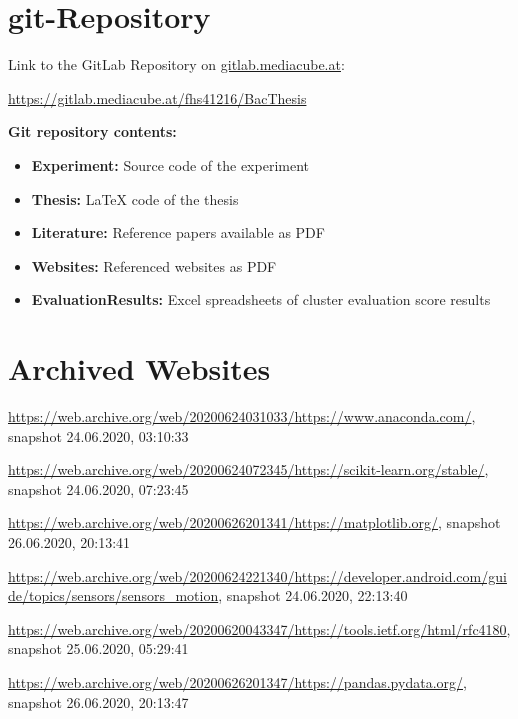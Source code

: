 \begin{appendices}

\section{git-Repository}



Link to the GitLab Repository on {\url{gitlab.mediacube.at}}:

{\color{red}\url{https://gitlab.mediacube.at/fhs41216/BacThesis}}

\vspace{5mm} %

\textbf{Git repository contents:}

\begin{itemize}
	\item \textbf{Experiment:} Source code of the experiment
	\item \textbf{Thesis:} LaTeX code of the thesis
	\item \textbf{Literature:} Reference papers available as PDF
	\item \textbf{Websites:} Referenced websites as PDF
	\item \textbf{EvaluationResults:} Excel spreadsheets of cluster evaluation score results
\end{itemize}



\section{Archived Websites}
\label{appendix:archivedWebsites}
\sloppy
\url{https://web.archive.org/web/20200624031033/https://www.anaconda.com/}, snapshot 24.06.2020, 03:10:33

\url{https://web.archive.org/web/20200624072345/https://scikit-learn.org/stable/}, snapshot 24.06.2020, 07:23:45

\url{https://web.archive.org/web/20200626201341/https://matplotlib.org/}, snapshot 26.06.2020, 20:13:41

\url{https://web.archive.org/web/20200624221340/https://developer.android.com/guide/topics/sensors/sensors_motion}, snapshot 24.06.2020, 22:13:40

\url{https://web.archive.org/web/20200620043347/https://tools.ietf.org/html/rfc4180}, snapshot 25.06.2020, 05:29:41

\url{https://web.archive.org/web/20200626201347/https://pandas.pydata.org/}, snapshot 26.06.2020, 20:13:47


\end{appendices}
